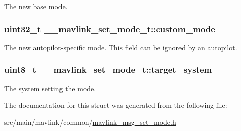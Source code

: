 The new base mode. 

\hypertarget{struct____mavlink__set__mode__t_ab932915605e53ff1f42c57f3159b63f6}{
\subsubsection[{custom\+\_\+mode}]{\setlength{\rightskip}{0pt plus 5cm}uint32\+\_\+t \+\_\+\+\_\+mavlink\+\_\+set\+\_\+mode\+\_\+t\+::custom\+\_\+mode}}\label{struct____mavlink__set__mode__t_ab932915605e53ff1f42c57f3159b63f6}


The new autopilot-\/specific mode. This field can be ignored by an autopilot. 

\hypertarget{struct____mavlink__set__mode__t_a58cf8afdf2920c038cae4645c79ac372}{
\subsubsection[{target\+\_\+system}]{\setlength{\rightskip}{0pt plus 5cm}uint8\+\_\+t \+\_\+\+\_\+mavlink\+\_\+set\+\_\+mode\+\_\+t\+::target\+\_\+system}}\label{struct____mavlink__set__mode__t_a58cf8afdf2920c038cae4645c79ac372}


The system setting the mode. 



The documentation for this struct was generated from the following file\+:\begin{DoxyCompactItemize}
\item 
src/main/mavlink/common/\hyperlink{mavlink__msg__set__mode_8h}{mavlink\+\_\+msg\+\_\+set\+\_\+mode.\+h}\end{DoxyCompactItemize}
